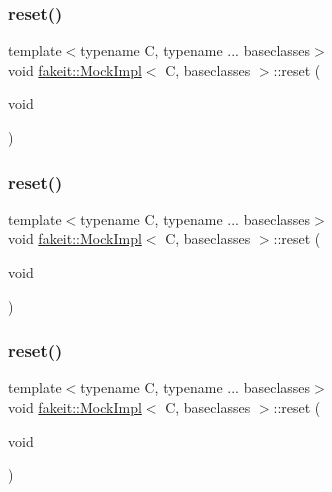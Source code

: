 \subsubsection{\texorpdfstring{reset()}{reset()}\hspace{0.1cm}{\footnotesize\ttfamily [5/9]}}
{\footnotesize\ttfamily template$<$typename C, typename ... baseclasses$>$ \\
void \mbox{\hyperlink{classfakeit_1_1MockImpl}{fakeit\+::\+Mock\+Impl}}$<$ C, baseclasses $>$\+::reset (\begin{DoxyParamCaption}\item[{void}]{ }\end{DoxyParamCaption})\hspace{0.3cm}{\ttfamily [inline]}}

\mbox{\label{classfakeit_1_1MockImpl_aad69a9c36fc64d0890f21ff15318a206}} 
\subsubsection{\texorpdfstring{reset()}{reset()}\hspace{0.1cm}{\footnotesize\ttfamily [6/9]}}
{\footnotesize\ttfamily template$<$typename C, typename ... baseclasses$>$ \\
void \mbox{\hyperlink{classfakeit_1_1MockImpl}{fakeit\+::\+Mock\+Impl}}$<$ C, baseclasses $>$\+::reset (\begin{DoxyParamCaption}\item[{void}]{ }\end{DoxyParamCaption})\hspace{0.3cm}{\ttfamily [inline]}}

\mbox{\label{classfakeit_1_1MockImpl_aad69a9c36fc64d0890f21ff15318a206}} 
\subsubsection{\texorpdfstring{reset()}{reset()}\hspace{0.1cm}{\footnotesize\ttfamily [7/9]}}
{\footnotesize\ttfamily template$<$typename C, typename ... baseclasses$>$ \\
void \mbox{\hyperlink{classfakeit_1_1MockImpl}{fakeit\+::\+Mock\+Impl}}$<$ C, baseclasses $>$\+::reset (\begin{DoxyParamCaption}\item[{void}]{ }\end{DoxyParamCaption})\hspace{0.3cm}{\ttfamily [inline]}}

